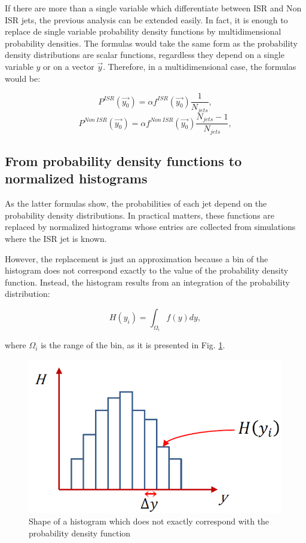 \documentclass[12pt, oneside]{book}              %
\begin{document}
If there are more than a single variable which differentiate between ISR and Non ISR jets, 
the previous analysis can be extended easily. In fact, it is enough to replace de single 
variable probability density functions by multidimensional probability densities. The formulas 
would take the same form as the probability density distributions are scalar functions, 
regardless they depend on a single variable $ y $ or on a vector $ \vec{y} $. Therefore, in 
a multidimensional case, the formulas would be:

\begin{equation} \label{eq:Prob_ISR_vec}
P^{ISR}(\vec{y_0}) = \alpha f^{ISR}(\vec{y_0}) \frac{1}{N_{jets}},
\end{equation}
\begin{equation} \label{eq:Prob_Non_ISR_vec}
P^{Non\ ISR}(\vec{y_0}) = \alpha f^{Non\ ISR}(\vec{y_0}) \frac{N_{jets}-1}{N_{jets}},
\end{equation}

\subsection{From probability density functions to normalized histograms} \label{sec:Histos}

As the latter formulas show, the probabilities of each jet depend on the probability density 
distributions. In practical matters, these functions are replaced by normalized histograms whose 
entries are collected from simulations where the ISR jet is known. 

However, the replacement is just an approximation because a bin of the histogram does not correspond
exactly to the value of the probability density function. Instead, the histogram results from an
integration of the probability distribution:

\begin{equation} \label{eq:histo}
H(y_i) = \int_{\Omega_i} f(y)dy,
\end{equation}

\noindent where $ \Omega_i $ is the range of the bin, as it is presented in Fig. \ref{fig:Histo_shape}.

\begin{figure}[h]
	\centering
	\includegraphics[width=0.5\linewidth]{./Imags_Doc/Histo_shape}
	\caption[Shape of a histogram]{Shape of a histogram which does not exactly correspond with the
		probability density function}
	\label{fig:Histo_shape}
\end{figure}
\end{document}
